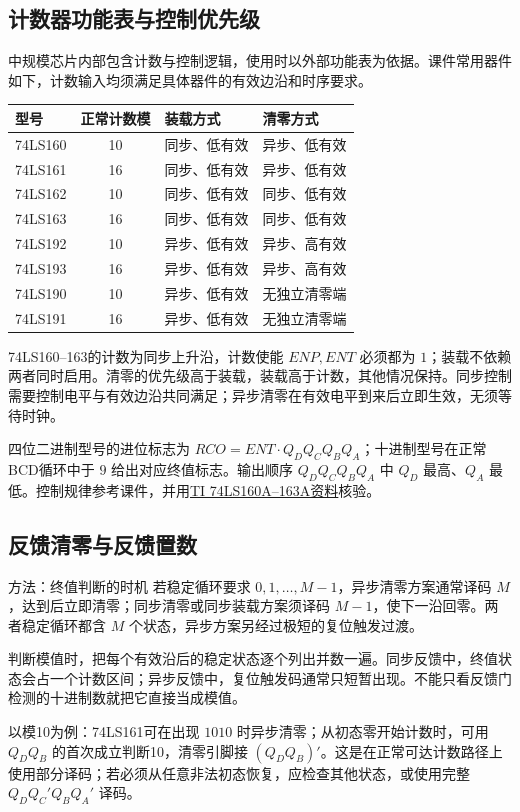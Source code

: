 \documentclass[UTF8,fontset=none,zihao=-4,a4paper]{ctexart}
\begin{document}
\subsection{计数器功能表与控制优先级}
中规模芯片内部包含计数与控制逻辑，使用时以外部功能表为依据。课件常用器件如下，计数输入均须满足具体器件的有效边沿和时序要求。
\begin{center}
\begin{tabular}{l c l l}
\toprule 型号&正常计数模&装载方式&清零方式\\\midrule
74LS160&10&同步、低有效&异步、低有效\\
74LS161&16&同步、低有效&异步、低有效\\
74LS162&10&同步、低有效&同步、低有效\\
74LS163&16&同步、低有效&同步、低有效\\
74LS192&10&异步、低有效&异步、高有效\\
74LS193&16&异步、低有效&异步、高有效\\
74LS190&10&异步、低有效&无独立清零端\\
74LS191&16&异步、低有效&无独立清零端\\\bottomrule
\end{tabular}
\end{center}
74LS160--163的计数为同步上升沿，计数使能 $ENP,ENT$ 必须都为 $1$；装载不依赖两者同时启用。清零的优先级高于装载，装载高于计数，其他情况保持。同步控制需要控制电平与有效边沿共同满足；异步清零在有效电平到来后立即生效，无须等待时钟。

四位二进制型号的进位标志为 $RCO=ENT\cdot Q_DQ_CQ_BQ_A$；十进制型号在正常BCD循环中于 $9$ 给出对应终值标志。输出顺序 $Q_DQ_CQ_BQ_A$ 中 $Q_D$ 最高、$Q_A$ 最低。控制规律参考课件，并用\href{https://www.ti.com/lit/ds/symlink/sn74ls163a.pdf}{TI 74LS160A--163A资料}核验。

\subsection{反馈清零与反馈置数}
\begin{infobox}{方法：终值判断的时机}
若稳定循环要求 $0,1,\ldots,M-1$，异步清零方案通常译码 $M$，达到后立即清零；同步清零或同步装载方案须译码 $M-1$，使下一沿回零。两者稳定循环都含 $M$ 个状态，异步方案另经过极短的复位触发过渡。

判断模值时，把每个有效沿后的稳定状态逐个列出并数一遍。同步反馈中，终值状态会占一个计数区间；异步反馈中，复位触发码通常只短暂出现。不能只看反馈门检测的十进制数就把它直接当成模值。
\end{infobox}
以模10为例：74LS161可在出现 $1010$ 时异步清零；从初态零开始计数时，可用 $Q_DQ_B$ 的首次成立判断10，清零引脚接 $(Q_DQ_B)'$。这是在正常可达计数路径上使用部分译码；若必须从任意非法初态恢复，应检查其他状态，或使用完整 $Q_DQ_C'Q_BQ_A'$ 译码。
\end{document}
